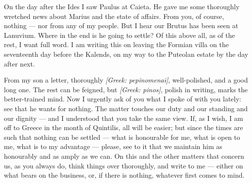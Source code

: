 

 On the day after the Ides I saw Paulus at Caieta. He gave me some thoroughly wretched news about Marius and the state of affairs. From you, of course, nothing --- nor from any of my people. But I hear our Brutus has been seen at Lanuvium. Where in the end is he going to settle? Of this above all, as of the rest, I want full word. I am writing this on leaving the Formian villa on the seventeenth day before the Kalends, on my way to the Puteolan estate by the day after next.

 From my son a letter, thoroughly \textit{[Greek: pepinomenai]}, well-polished, and a good long one. The rest can be feigned, but \textit{[Greek: pinos]}, polish in writing, marks the better-trained mind. Now I urgently ask of you what I spoke of with you lately: see that he wants for nothing. The matter touches our duty and our standing and our dignity --- and I understood that you take the same view. If, as I wish, I am off to Greece in the month of Quintilis, all will be easier; but since the times are such that nothing can be settled --- what is honourable for me, what is open to me, what is to my advantage --- please, see to it that we maintain him as honourably and as amply as we can. On this and the other matters that concern us, as you always do, think things over thoroughly, and write to me --- either on what bears on the business, or, if there is nothing, whatever first comes to mind.
